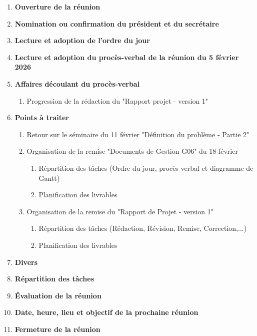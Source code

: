 \documentclass[12pt]{ULojpv}
\begin{document}
\entete
\begin{enumerate}
   \item \textbf{Ouverture de la réunion}
   \item \textbf{Nomination ou confirmation du président et du secrétaire}
   \item \textbf{Lecture et adoption de l'ordre du jour}
   \item \textbf{Lecture et adoption du procès-verbal de la réunion du 5 février 2026}
   \item \textbf{Affaires découlant du procès-verbal}
      \begin{enumerate}
         \item Progression de la rédaction du "Rapport projet - version 1"    
      \end{enumerate}
   \item \textbf{Points à traiter}
      \begin{enumerate}
         \item Retour sur le séminaire du 11 février "Définition du problème - Partie 2"
         \item Organisation de la remise "Documents de Gestion G06" du 18 février
          \begin{enumerate}
               \item Répartition des tâches (Ordre du jour, procès verbal et diagramme de Gantt)
               \item Planification des livrables
            \end{enumerate}
        \item Organisation de la remise du "Rapport de Projet - version 1"  
        \begin{enumerate}
               \item Répartition des tâches (Rédaction, Révision, Remise, Correction,...)
               \item Planification des livrables
            \end{enumerate}
        
      \end{enumerate}
   \item \textbf{Divers}
   \item \textbf{Répartition des tâches}
   \item \textbf{Évaluation de la réunion}
   \item \textbf{Date, heure, lieu et objectif de la prochaine réunion}
   \item \textbf{Fermeture de la réunion}
\end{enumerate}
\end{document}
